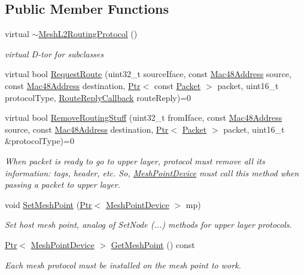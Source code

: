 \subsection*{Public Member Functions}
\begin{DoxyCompactItemize}
\item 
virtual \hyperlink{classns3_1_1MeshL2RoutingProtocol_ad438f0734c0146f48a14363672f51879}{$\sim$\+Mesh\+L2\+Routing\+Protocol} ()
\begin{DoxyCompactList}\small\item\em virtual D-\/tor for subclasses \end{DoxyCompactList}\item 
virtual bool \hyperlink{classns3_1_1MeshL2RoutingProtocol_a978b19cfc40272f5c39ed5e1999f9c8c}{Request\+Route} (uint32\+\_\+t source\+Iface, const \hyperlink{classns3_1_1Mac48Address}{Mac48\+Address} source, const \hyperlink{classns3_1_1Mac48Address}{Mac48\+Address} destination, \hyperlink{classns3_1_1Ptr}{Ptr}$<$ const \hyperlink{classns3_1_1Packet}{Packet} $>$ packet, uint16\+\_\+t protocol\+Type, \hyperlink{classns3_1_1MeshL2RoutingProtocol_a4c415efa22789b3a3bb5538b8fcf3e6a}{Route\+Reply\+Callback} route\+Reply)=0
\item 
virtual bool \hyperlink{classns3_1_1MeshL2RoutingProtocol_ae110ac0c9b8f81cb2a05940b385e7f08}{Remove\+Routing\+Stuff} (uint32\+\_\+t from\+Iface, const \hyperlink{classns3_1_1Mac48Address}{Mac48\+Address} source, const \hyperlink{classns3_1_1Mac48Address}{Mac48\+Address} destination, \hyperlink{classns3_1_1Ptr}{Ptr}$<$ \hyperlink{classns3_1_1Packet}{Packet} $>$ packet, uint16\+\_\+t \&protocol\+Type)=0
\begin{DoxyCompactList}\small\item\em When packet is ready to go to upper layer, protocol must remove all its information\+: tags, header, etc. So, \hyperlink{classns3_1_1MeshPointDevice}{Mesh\+Point\+Device} must call this method when passing a packet to upper layer. \end{DoxyCompactList}\item 
void \hyperlink{classns3_1_1MeshL2RoutingProtocol_a77a122b1cfbe10f5bf2b6c61fbd85b60}{Set\+Mesh\+Point} (\hyperlink{classns3_1_1Ptr}{Ptr}$<$ \hyperlink{classns3_1_1MeshPointDevice}{Mesh\+Point\+Device} $>$ mp)
\begin{DoxyCompactList}\small\item\em Set host mesh point, analog of Set\+Node (...) methods for upper layer protocols. \end{DoxyCompactList}\item 
\hyperlink{classns3_1_1Ptr}{Ptr}$<$ \hyperlink{classns3_1_1MeshPointDevice}{Mesh\+Point\+Device} $>$ \hyperlink{classns3_1_1MeshL2RoutingProtocol_a630575428f626e58f0c8ac3fae24007e}{Get\+Mesh\+Point} () const 
\begin{DoxyCompactList}\small\item\em Each mesh protocol must be installed on the mesh point to work. \end{DoxyCompactList}\end{DoxyCompactItemize}

